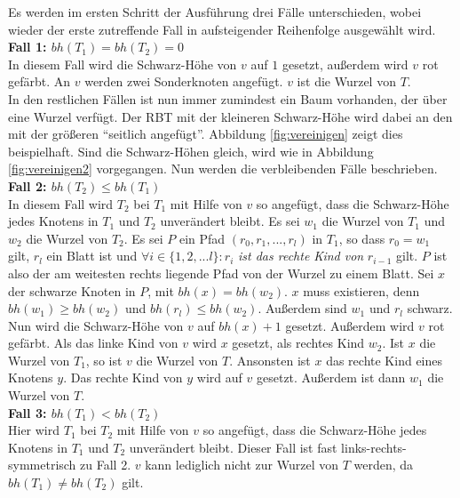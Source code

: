 \documentclass[a4paper,12pt]{article}
\begin{document}
Es werden im ersten Schritt der Ausführung drei Fälle unterschieden, wobei wieder der erste zutreffende Fall in aufsteigender Reihenfolge ausgewählt wird. \\
\noindent\textbf{Fall 1: $bh(T_1) = bh(T_2) = 0$ }\\   
In diesem Fall wird die Schwarz-Höhe von $v$  auf $1$ gesetzt, außerdem wird $v$ rot gefärbt. An $v$ werden zwei Sonderknoten angefügt. $v$ ist die Wurzel von $T$. \\
In den restlichen Fällen ist nun immer zumindest ein Baum vorhanden, der über eine Wurzel verfügt. Der RBT mit der kleineren Schwarz-Höhe wird dabei an den mit der größeren \enquote{seitlich angefügt}. Abbildung \ref{fig:vereinigen} zeigt dies beispielhaft. Sind die Schwarz-Höhen gleich, wird wie in Abbildung \ref{fig:vereinigen2} vorgegangen. Nun werden die verbleibenden Fälle beschrieben.\\
\noindent\textbf{Fall 2: $bh(T_2) \leq bh(T_1)$ }\\
In diesem Fall wird $T_2$ bei $T_1$ mit Hilfe von $v$ so angefügt, dass die Schwarz-Höhe jedes Knotens in $T_1$ und $T_2$ unverändert bleibt. Es sei $w_1$ die Wurzel von $T_1$ und $w_2$ die Wurzel von $T_2$. Es sei $P$ ein Pfad $(r_0,r_1,...,r_l)$ in $T_1$, so dass $r_0 = w_1$  gilt, $r_l$ ein Blatt ist und $\forall i \in \{1,2,...l\} \colon r_i$  \textit{ist das rechte Kind von}  $r_{i-1}$ gilt. $P$ ist also der am weitesten rechts liegende Pfad von der Wurzel zu einem Blatt. Sei $x$ der schwarze Knoten in $P$, mit $\mathit{bh}(x) = \mathit{bh}(w_2)$. $x$ muss existieren, denn $\mathit{bh}(w_1) \geq \mathit{bh}(w_2)$ und $\mathit{bh}(r_l) \leq  \mathit{bh}(w_2)$. Außerdem sind $w_1$ und $r_l$ schwarz.\\
Nun wird die Schwarz-Höhe von $v$ auf $\mathit{bh}(x) + 1$ gesetzt. Außerdem wird $v$ rot gefärbt. Als das linke Kind von $v$  wird $x$ gesetzt, als rechtes Kind $w_2$. Ist $x$ die Wurzel von $T_1$, so ist $v$ die Wurzel von $T$. Ansonsten ist $x$ das rechte Kind eines Knotens $y$. Das rechte Kind von $y$ wird auf $v$ gesetzt. Außerdem ist dann $w_1$ die Wurzel von $T$.     \\  
\noindent\textbf{Fall 3: $bh(T_1) < bh(T_2)$ }\\ 
Hier wird $T_1$ bei $T_2$ mit Hilfe von $v$ so angefügt, dass die Schwarz-Höhe jedes Knotens in $T_1$ und $T_2$  unverändert bleibt. Dieser Fall ist fast links-rechts-symmetrisch zu Fall 2. $v$ kann lediglich nicht zur Wurzel von $T$ werden, da $bh(T_1) \neq bh(T_2)$ gilt.
\end{document}
